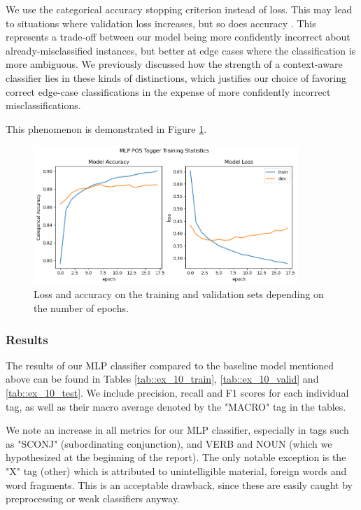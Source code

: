 \documentclass[11pt, a4paper]{article}
\begin{document}
	We use the categorical accuracy stopping criterion instead of loss. This may lead to situations where validation loss increases, but so does accuracy \cite{loss-accuracy}. This represents a trade-off between our model being more confidently incorrect about already-misclassified instances, but better at edge cases where the classification is more ambiguous. We previously discussed how the strength of a context-aware classifier lies in these kinds of distinctions, which justifies our choice of favoring correct edge-case classifications in the expense of more confidently incorrect misclassifications.
	
	This phenomenon is demonstrated in Figure \ref{fig::ex_10_fit}.
	
	\begin{figure}
		\centering
		\includegraphics[width=10cm]{"ex_10_fit.png"}
		\caption{Loss and accuracy on the training and validation sets depending on the number of epochs.}
		\label{fig::ex_10_fit}
	\end{figure}
	
	
	\subsubsection{Results}
	
	The results of our MLP classifier compared to the baseline model mentioned above can be found in Tables \ref{tab::ex_10_train}, \ref{tab::ex_10_valid} and \ref{tab::ex_10_test}. We include precision, recall and F1 scores for each individual tag, as well as their macro average denoted by the "MACRO" tag in the tables.
	
	We note an increase in all metrics for our MLP classifier, especially in tags such as "SCONJ" (subordinating conjunction), and VERB and NOUN (which we hypothesized at the beginning of the report). The only notable exception is the "X" tag (other) which is attributed to unintelligible material, foreign words and word fragments. This is an acceptable drawback, since these are easily caught by preprocessing or weak classifiers anyway.

	
	
	
	
	

	

	\printbibliography
	
\end{document}
